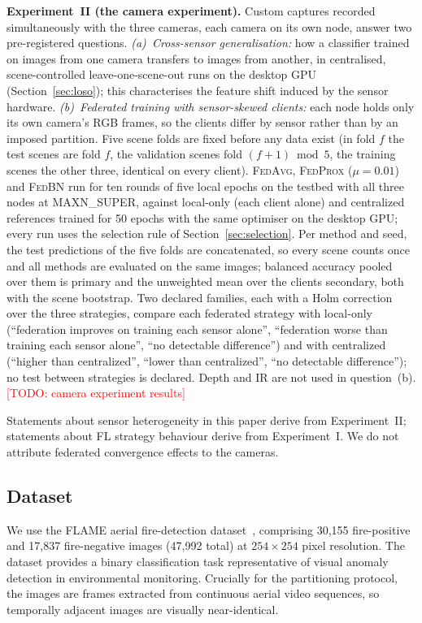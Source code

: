 \documentclass[journal]{IEEEtran}
\newcommand{\fedavg}{\textsc{FedAvg}}
\newcommand{\fedprox}{\textsc{FedProx}}
\newcommand{\fedbn}{\textsc{FedBN}}
\newcommand{\todo}[1]{\textcolor{red}{[TODO: #1]}}
\begin{document}
\textbf{Experiment~II (the camera experiment).} Custom captures recorded simultaneously with the three cameras, each camera on its own node, answer two pre-registered questions. \emph{(a)~Cross-sensor generalisation:} how a classifier trained on images from one camera transfers to images from another, in centralised, scene-controlled leave-one-scene-out runs on the desktop GPU (Section~\ref{sec:loso}); this characterises the feature shift induced by the sensor hardware. \emph{(b)~Federated training with sensor-skewed clients:} each node holds only its own camera's RGB frames, so the clients differ by sensor rather than by an imposed partition. Five scene folds are fixed before any data exist (in fold $f$ the test scenes are fold $f$, the validation scenes fold $(f{+}1) \bmod 5$, the training scenes the other three, identical on every client). \fedavg{}, \fedprox{} ($\mu=0.01$) and \fedbn{} run for ten rounds of five local epochs on the testbed with all three nodes at MAXN\_SUPER, against local-only (each client alone) and centralized references trained for 50 epochs with the same optimiser on the desktop GPU; every run uses the selection rule of Section~\ref{sec:selection}. Per method and seed, the test predictions of the five folds are concatenated, so every scene counts once and all methods are evaluated on the same images; balanced accuracy pooled over them is primary and the unweighted mean over the clients secondary, both with the scene bootstrap. Two declared families, each with a Holm correction over the three strategies, compare each federated strategy with local-only (``federation improves on training each sensor alone'', ``federation worse than training each sensor alone'', ``no detectable difference'') and with centralized (``higher than centralized'', ``lower than centralized'', ``no detectable difference''); no test between strategies is declared. Depth and IR are not used in question~(b). \todo{camera experiment results}

Statements about sensor heterogeneity in this paper derive from Experiment~II; statements about FL strategy behaviour derive from Experiment~I. We do not attribute federated convergence effects to the cameras.

\subsection{Dataset}

We use the FLAME aerial fire-detection dataset~\cite{shamsoshoara2021flame, flame_dataset}, comprising 30{,}155 fire-positive and 17{,}837 fire-negative images (47{,}992 total) at $254 \times 254$ pixel resolution. The dataset provides a binary classification task representative of visual anomaly detection in environmental monitoring. Crucially for the partitioning protocol, the images are frames extracted from continuous aerial video sequences, so temporally adjacent images are visually near-identical.
\end{document}
